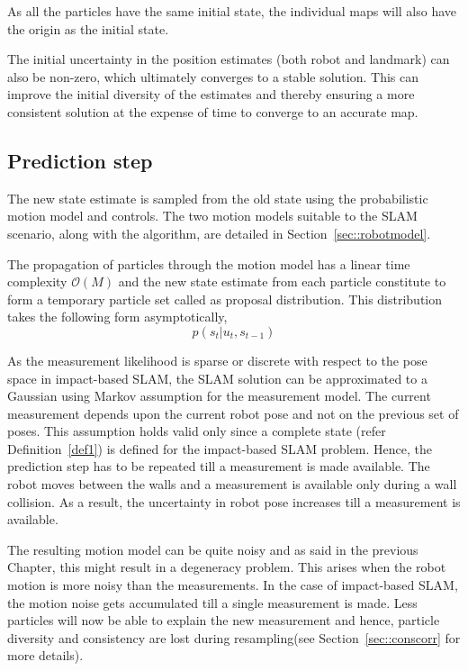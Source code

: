 As all the particles have the same initial state, the individual maps will also have the origin as the initial state.

\begin{rem}
The initial uncertainty in the position estimates (both robot and landmark) can also be non-zero, which ultimately converges to a stable solution. This can improve the initial diversity of the estimates and thereby ensuring a more consistent solution at the expense of time to converge to an accurate map. 
\end{rem}

\subsection{Prediction step} \label{sec::fastslam_pred}
The new state estimate is sampled from the old state using the probabilistic motion model and controls. The two motion models suitable to the SLAM scenario, along with the algorithm, are detailed in Section~\ref{sec::robotmodel}. 

The propagation of particles through the motion model has a linear time complexity $\mathcal{O}(M)$ and the new state estimate from each particle constitute to form a temporary particle set called as proposal distribution. This distribution takes the following form asymptotically,
\begin{equation}
p(s_t|u_t,s_{t-1})
\end{equation}

As the measurement likelihood is sparse or discrete with respect to the pose space in impact-based SLAM, the SLAM solution can be approximated to a Gaussian using Markov assumption for the measurement model. The current measurement depends upon the current robot pose and not on the previous set of poses. This assumption holds valid only since a complete state (refer Definition~\ref{def1}) is defined for the impact-based SLAM problem. Hence, the prediction step has to be repeated till a measurement is made available. The robot moves between the walls and a measurement is available only during a wall collision. As a result, the uncertainty in robot pose increases till a measurement is available.

The resulting motion model can be quite noisy and as said in the previous Chapter, this might result in a degeneracy problem. This arises when the robot motion is more noisy than the measurements. In the case of impact-based SLAM, the motion noise gets accumulated till a single measurement is made. Less particles will now be able to explain the new measurement and hence, particle diversity and consistency are lost during resampling(see Section~\ref{sec::conscorr} for more details). 

